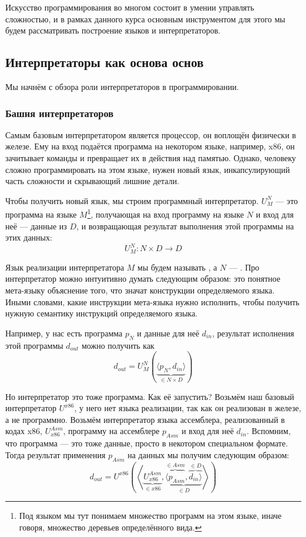 
Искусство программирования во многом состоит в умении управлять сложностью, и в рамках данного курса основным инструментом для этого мы будем рассматривать построение языков и интерпретаторов.

\subsection{Интерпретаторы как основа основ} \label{subsec:interpreters-rules}

Мы начнём с обзора роли интерпретаторов в программировании.

\subsubsection{Башня интерпретаторов} \label{subsubsec:interpreters-tower}

Самым базовым интерпретатором является процессор, он воплощён физически в железе.
Ему на вход подаётся программа на некотором языке, например, x86, он зачитывает команды и превращает их в действия над памятью.
Однако, человеку сложно программировать на этом языке, нужен новый язык, инкапсулирующий часть сложности и скрывающий лишние детали.

Чтобы получить новый язык, мы строим программный интерпретатор.
 $U_M^N$ --- это программа на языке $M$\footnote{Под языком мы тут понимаем множество программ на этом языке, иначе говоря, множество деревьев определённого вида.}, получающая на вход программу на языке $N$ и вход для неё --- данные из $D$, и возвращающая результат выполнения этой программы на этих данных: \[U_M^N : N\times D\to D\]

Язык реализации интерпретатора $M$ мы будем называть , а $N$ --- .
Про интерпретатор можно интуитивно думать следующим образом: это понятное мета-языку объяснение того, что значат конструкции определяемого языка.
Иными словами, какие инструкции мета-языка нужно исполнить, чтобы получить нужную семантику инструкций определяемого языка.

Например, у нас есть программа $p_N$ и данные для неё $d_{in}$, результат исполнения этой программы $d_{out}$ можно получить как \[d_{out} = U_M^N\left( \underbrace{\langle p_N, d_{in} \rangle}_{\in N\times D} \right)\]

Но интерпретатор это тоже программа.
Как её запустить?
Возьмём наш базовый интерпретатор $U^{x86}$, у него нет языка реализации, так как он реализован в железе, а не программно.
Возьмём интерпретатор языка ассемблера, реализованный в кодах x86, $U_{x86}^{Asm}$, программу на ассемблере $p_{Asm}$ и вход для неё $d_{in}$.
Вспомним, что программа --- это тоже данные, просто в некотором специальном формате.
Тогда результат применения $p_{Asm}$ на данных мы получим следующим образом:
\[
    d_{out} = U^{x86}\left(\left<\underbrace{U_{x86}^{Asm}}_{\in x86}, \underbrace{\overbrace{\langle p_{Asm}}^{\in Asm}, \overbrace{d_{in} \rangle}^{\in D}}_{\in D} \right>\right)
\]


